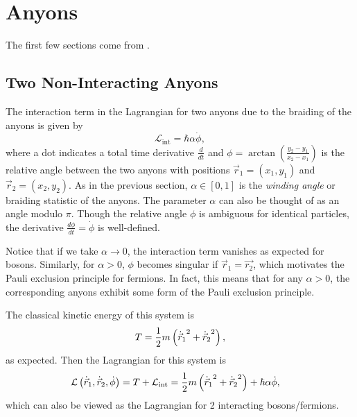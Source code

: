 \chapter{Anyons}\label{ch:anyons}

The first few sections come from \cite{Khare2005}.

\section{Two Non-Interacting Anyons}\label{sec:non_int}

The interaction term in the Lagrangian for two anyons due to the braiding of the anyons is given by
\begin{equation}
    \mathcal{L}_{\text{int}} = \hbar\alpha\dot{\phi},
\end{equation}
where a dot indicates a total time derivative $\frac{d}{dt}$ and $\phi = \arctan\left( \frac{y_2-y_1}{x_2-x_1} \right)$ is the relative angle between the two anyons with positions $\vec{r}_1=(x_1,y_1)$ and $\vec{r}_2=(x_2,y_2)$. As in the previous section, $\alpha\in\left[ 0,1 \right]$ is the \textit{winding angle} or braiding statistic of the anyons. The parameter $\alpha$ can also be thought of as an angle modulo $\pi$. Though the relative angle $\phi$ is ambiguous for identical particles, the derivative $\frac{d\phi}{dt}=\dot{\phi}$ is well-defined.

Notice that if we take $\alpha\to 0$, the interaction term vanishes as expected for bosons. Similarly, for $\alpha>0$, $\phi$ becomes singular if $\vec{r}_1 = \vec{r_2}$, which motivates the Pauli exclusion principle for fermions. In fact, this means that for any $\alpha>0$, the corresponding anyons exhibit some form of the Pauli exclusion principle.

The classical kinetic energy of this system is
\begin{equation}
    T = \frac{1}{2}m\left( {\dot{\vec{r}}_1}^2 + {\dot{\vec{r}}_2}^2 \right),
\end{equation}
as expected. Then the Lagrangian for this system is
\begin{align}
    \mathcal{L}\left( \dot{\vec{r}}_1,\dot{\vec{r}}_2, \dot{\phi} \right) &= T + \mathcal{L}_{\text{int}} = \frac{1}{2}m\left( {\dot{\vec{r}}_1}^2 + {\dot{\vec{r}}_2}^2 \right) + \hbar\alpha\dot{\phi},
\end{align}
which can also be viewed as the Lagrangian for 2 interacting bosons/fermions.

